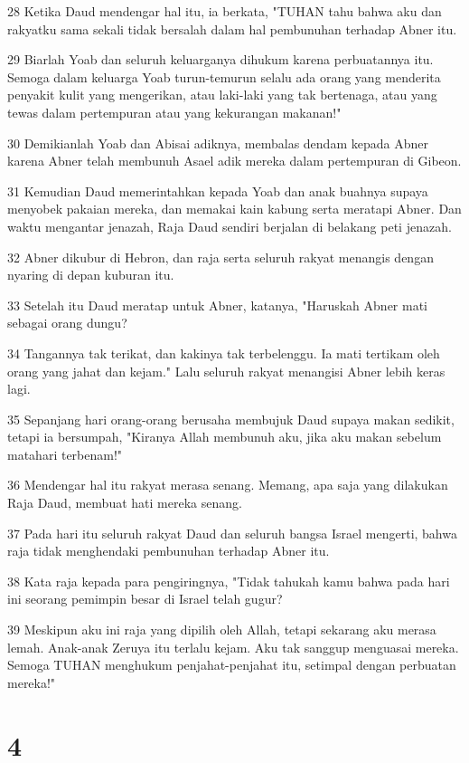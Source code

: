 \par 28 Ketika Daud mendengar hal itu, ia berkata, "TUHAN tahu bahwa aku dan rakyatku sama sekali tidak bersalah dalam hal pembunuhan terhadap Abner itu.
\par 29 Biarlah Yoab dan seluruh keluarganya dihukum karena perbuatannya itu. Semoga dalam keluarga Yoab turun-temurun selalu ada orang yang menderita penyakit kulit yang mengerikan, atau laki-laki yang tak bertenaga, atau yang tewas dalam pertempuran atau yang kekurangan makanan!"
\par 30 Demikianlah Yoab dan Abisai adiknya, membalas dendam kepada Abner karena Abner telah membunuh Asael adik mereka dalam pertempuran di Gibeon.
\par 31 Kemudian Daud memerintahkan kepada Yoab dan anak buahnya supaya menyobek pakaian mereka, dan memakai kain kabung serta meratapi Abner. Dan waktu mengantar jenazah, Raja Daud sendiri berjalan di belakang peti jenazah.
\par 32 Abner dikubur di Hebron, dan raja serta seluruh rakyat menangis dengan nyaring di depan kuburan itu.
\par 33 Setelah itu Daud meratap untuk Abner, katanya, "Haruskah Abner mati sebagai orang dungu?
\par 34 Tangannya tak terikat, dan kakinya tak terbelenggu. Ia mati tertikam oleh orang yang jahat dan kejam." Lalu seluruh rakyat menangisi Abner lebih keras lagi.
\par 35 Sepanjang hari orang-orang berusaha membujuk Daud supaya makan sedikit, tetapi ia bersumpah, "Kiranya Allah membunuh aku, jika aku makan sebelum matahari terbenam!"
\par 36 Mendengar hal itu rakyat merasa senang. Memang, apa saja yang dilakukan Raja Daud, membuat hati mereka senang.
\par 37 Pada hari itu seluruh rakyat Daud dan seluruh bangsa Israel mengerti, bahwa raja tidak menghendaki pembunuhan terhadap Abner itu.
\par 38 Kata raja kepada para pengiringnya, "Tidak tahukah kamu bahwa pada hari ini seorang pemimpin besar di Israel telah gugur?
\par 39 Meskipun aku ini raja yang dipilih oleh Allah, tetapi sekarang aku merasa lemah. Anak-anak Zeruya itu terlalu kejam. Aku tak sanggup menguasai mereka. Semoga TUHAN menghukum penjahat-penjahat itu, setimpal dengan perbuatan mereka!"

\chapter{4}

